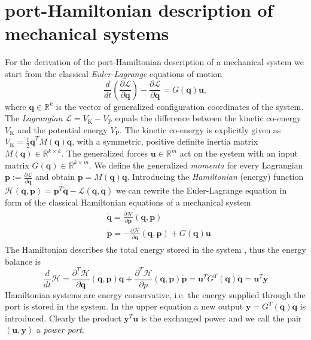 \documentclass[a4paper,twoside, openright,12pt]{report}
\newcommand{\f}[1]{\boldsymbol{#1}}
\newcommand{\g}[1]{\text{#1}}
\begin{document}
{\section{port-Hamiltonian description of mechanical systems}\label{S:HSdescription}
For the derivation of the port-Hamiltonian description of a mechanical system we start from the classical \emph{Euler-Lagrange} equations of motion
\begin{equation}
\frac{d}{dt}\left(\frac{\partial \mathcal{L}}{\partial \dot{\f{q}}}\right) - \frac{\partial \mathcal{L}}{\partial \f{q}} = G(\f{q})\f{u},
\end{equation}
where $\f{q} \in \mathbb{R}^k$ is the vector of generalized configuration coordinates of the system. The \emph{Lagrangian} $\mathcal{L} = V_\g{K} - V_\g{P}$ equals the difference between the kinetic co-energy $V_\g{K}$ and the potential energy $V_\g{P}$. The kinetic co-energy is explicitly given as $V_\g{K} = \frac{1}{2} \dot{\f{q}}^T M(\f{q}) \dot{\f{q}}$, with a symmetric, positive definite inertia matrix $M(\f{q}) \in \mathbb{R}^{k \times k}$. The generalized forces $\f{u} \in \mathbb{R}^m$ act on the system with an input matrix $G(\f{q}) \in \mathbb{R}^{k \times m}$. We define the generalized \emph{momenta} for every Lagrangian $\f{p} := \frac{\partial \mathcal{L}}{\partial \dot{\f{q}}}$ and obtain $\f{p} = M(\f{q})\dot{\f{q}}$.
Introducing the \emph{Hamiltonian} (energy) function $\mathcal{H}(\f{q},\f{p}) = \f{p}^T\dot{\f{q}} - \mathcal{L}(\f{q},\dot{\f{q}})$ we can rewrite the Euler-Lagrange equation in form of the classical Hamiltonian equations of a mechanical system \begin{eqnarray}\label{EQ:mechanicalPHS}
	\begin{aligned}
	& \dot{\f{q}} = \frac{\partial \mathcal{H}}{\partial \f{p}}(\f{q},\f{p})\\
	& \dot{\f{p}} = -\frac{\partial \mathcal{H}}{\partial \f{q}}(\f{q},\f{p}) + G(\f{q})\f{u}
	\end{aligned}
\end{eqnarray}
The Hamiltonian describes the total energy stored in the system \cite{vanderSchaft_06}, thus the energy balance is
\begin{equation}
	\frac{d}{dt}\mathcal{H} = \frac{\partial^T \mathcal{H}}{\partial \f{q}}(\f{q},\f{p})\dot{\f{q}} + \frac{\partial^T \mathcal{H}}{\partial p}(\f{q},\f{p})\dot{\f{p}} = \f{u}^TG^T(\f{q})\dot{\f{q}} = \f{u}^T\f{y}
\end{equation}
Hamiltonian systems are energy conservative, i.e. the energy supplied through the port is stored in the system. In the upper equation a new output $\f{y}=G^T(\f{q})\dot{\f{q}}$ is introduced. Clearly the product $\f{y}^T\f{u}$ is the exchanged power and we call the pair $(\f{u},\f{y})$ a \emph{power port}.
}
\end{document}
